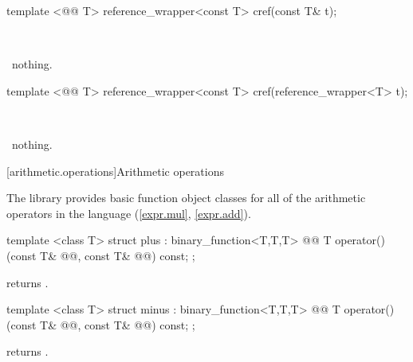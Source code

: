 \documentclass[american,twoside]{book}
\begin{document}
%
%
\begin{itemdecl}
template <@@ T> reference_wrapper<const T> cref(const T& t); 
\end{itemdecl}

\begin{itemdescr}
\pnum\returns\ 

\pnum\throws\  nothing. 
\end{itemdescr}

%
%
\begin{itemdecl}
template <@@ T> reference_wrapper<const T> cref(reference_wrapper<T> t);
\end{itemdecl}

\begin{itemdescr}
\pnum\returns\ 

\pnum\throws\  nothing. 
\end{itemdescr}

[arithmetic.operations]{Arithmetic operations}

\pnum
The library provides basic function object classes for all of the arithmetic
operators in the language (\ref{expr.mul}, \ref{expr.add}).

%
\begin{itemdecl}
template <class T> struct plus : binary_function<T,T,T> {
  @@
    T operator()(const T& @@, const T& @@) const;
};
\end{itemdecl}

\begin{itemdescr}
\pnum
{}
returns
.
\end{itemdescr}

%
\begin{itemdecl}
template <class T> struct minus : binary_function<T,T,T> {
  @@
    T operator()(const T& @@, const T& @@) const;
};
\end{itemdecl}

\begin{itemdescr}
\pnum
{}
returns
.
\end{itemdescr}
\end{document}
